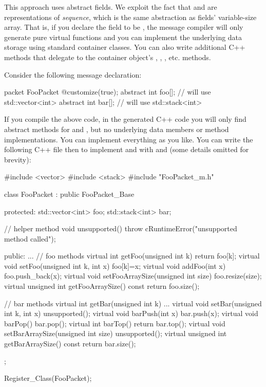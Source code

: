 This approach uses abstract fields. We exploit the fact that
 and  are representations of
\textit{sequence}, which is the same abstraction as fields' variable-size
array. That is, if you declare the field to be ,
the message compiler will only generate pure virtual functions and you can
implement the underlying data storage using standard container classes. You
can also write additional C++ methods that delegate to the container
object's , , , etc. methods.

Consider the following message declaration:

\begin{msg}
packet FooPacket
{
    @customize(true);
    abstract int foo[]; // will use std::vector<int>
    abstract int bar[]; // will use std::stack<int>
}
\end{msg}

If you compile the above code, in the generated C++ code you will only find
abstract methods for  and , but no underlying data
members or method implementations. You can implement everything as you
like. You can write the following C++ file then to implement  and
 with  and  (some details omitted
for brevity):

\begin{cpp}
#include <vector>
#include <stack>
#include "FooPacket_m.h"

class FooPacket : public FooPacket_Base
{
  protected:
    std::vector<int> foo;
    std::stack<int> bar;

    // helper method
    void unsupported() {throw cRuntimeError("unsupported method called");}

  public:
    ...
    // foo methods
    virtual int getFoo(unsigned int k) {return foo[k];}
    virtual void setFoo(unsigned int k, int x) {foo[k]=x;}
    virtual void addFoo(int x) {foo.push_back(x);}
    virtual void setFooArraySize(unsigned int size) {foo.resize(size);}
    virtual unsigned int getFooArraySize() const {return foo.size();}

    // bar methods
    virtual int getBar(unsigned int k) {...}
    virtual void setBar(unsigned int k, int x) {unsupported();}
    virtual void barPush(int x) {bar.push(x);}
    virtual void barPop() {bar.pop();}
    virtual int barTop() {return bar.top();}
    virtual void setBarArraySize(unsigned int size) {unsupported();}
    virtual unsigned int getBarArraySize() const {return bar.size();}
};

Register_Class(FooPacket);
\end{cpp}

